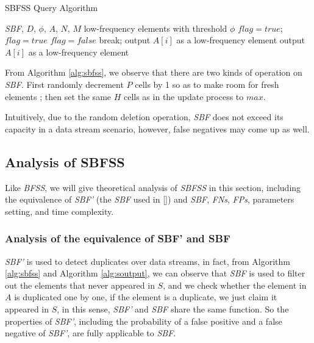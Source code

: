 \documentclass[conference]{IEEEtran}
\begin{document}
\begin{algorithm}[h]
	\caption{SBFSS Query Algorithm}
	\label{alg:soutput}
	\begin{algorithmic}[1]
		\REQUIRE \emph{SBF}, $D$, $\phi$, $A$, $N$, $M$
		\ENSURE low-frequency elements with threshold $\phi$
		\STATE $flag=true$; 
		\STATE $flag=true$
		\STATE $flag=false$
		\STATE break;
		\ENDIF
		\ENDFOR
		\STATE output $A[i]$ as a low-frequency element
		\ENDIF
		\ELSE
		\STATE output $A[i]$ as a low-frequency element
		\ENDIF
		\ENDIF
		\ENDFOR
	\end{algorithmic}
\end{algorithm}

From Algorithm \ref{alg:sbfss}, we observe that there are two kinds of operation on \emph{SBF}. First randomly decrement $P$ cells by 1 so as to make room for fresh elements
; then set the same $H$ cells as in the update process to $max$.\par 
Intuitively, due to the random deletion operation, \emph{SBF} does not exceed its capacity in a data stream scenario, however, false negatives may come up as well.

\subsection{Analysis of SBFSS}
Like \emph{BFSS}, we will give theoretical analysis of \emph{SBFSS} in this section, including the equivalence of \emph{SBF'} (the \emph{SBF} used in []) and \emph{SBF}, \emph{FNs}, \emph{FPs}, parameters setting, and time complexity.\par
\subsubsection{\textbf{Analysis of the equivalence of SBF' and SBF}}
\emph{SBF'} is used to detect duplicates over data streams, in fact, from Algorithm \ref{alg:sbfss} and Algorithm \ref{alg:soutput}, we can observe that \emph{SBF} is used to filter out the elements that never appeared in $S$, and we check whether the element in $A$ is duplicated one by one, if the element is a duplicate, we just claim it appeared in $S$, in this sense, \emph{SBF'} and \emph{SBF} share the same function. So the properties of \emph{SBF'}, including the probability of a false positive and a false negative of \emph{SBF'}, are fully applicable to \emph{SBF}.\par
\end{document}
